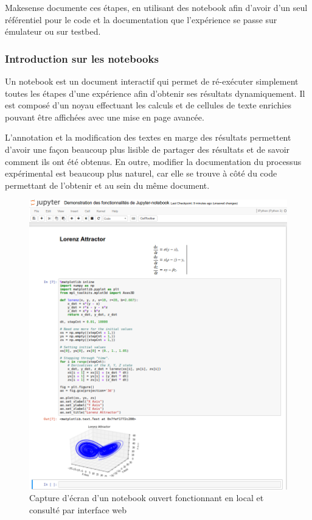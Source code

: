 Makesense documente ces étapes, en utilisant des notebook afin d'avoir d'un seul référentiel pour le code et la documentation que l'expérience se passe sur émulateur ou sur testbed.

\subsubsection{Introduction sur les notebooks}

Un notebook est un document interactif qui permet de ré-exécuter simplement toutes les étapes d'une expérience afin d'obtenir ses résultats dynamiquement. 
Il est composé d'un noyau effectuant les calculs et de cellules de texte enrichies pouvant être affichées avec une mise en page avancée.

L'annotation et la modification des textes en marge des résultats permettent d'avoir une façon beaucoup plus lisible de partager des résultats et de savoir comment ils ont été obtenus.
En outre, modifier la documentation du processus expérimental est beaucoup plus naturel, car elle se trouve à côté du code permettant de l'obtenir et au sein du même document.

\begin{figure}[ht]
  \centering
  \includegraphics[width=.8\textwidth]{img/jupyter_demo2.png}
  \caption{Capture d'écran d'un notebook ouvert fonctionnant en local et consulté par interface web}
  \label{makesense:fig:demo}
\end{figure}

